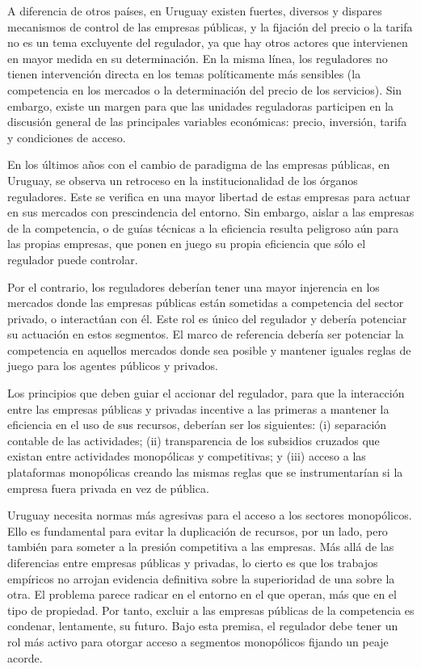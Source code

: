 \documentclass[
  12pt,
  spanish,
]{book}
\begin{document}
A diferencia de otros países, en Uruguay existen fuertes, diversos y dispares mecanismos de control de las empresas públicas, y la fijación del precio o la tarifa no es un tema excluyente del regulador, ya que hay otros actores que intervienen en mayor medida en su determinación. En la misma línea, los reguladores no tienen intervención directa en los temas políticamente más sensibles (la competencia en los mercados o la determinación del precio de los servicios). Sin embargo, existe un margen para que las unidades reguladoras participen en la discusión general de las principales variables económicas: precio, inversión, tarifa y condiciones de acceso.

En los últimos años con el cambio de paradigma de las empresas públicas, en Uruguay, se observa un retroceso en la institucionalidad de los órganos reguladores. Este se verifica en una mayor libertad de estas empresas para actuar en sus mercados con prescindencia del entorno. Sin embargo, aislar a las empresas de la competencia, o de guías técnicas a la eficiencia resulta peligroso aún para las propias empresas, que ponen en juego su propia eficiencia que sólo el regulador puede controlar.

Por el contrario, los reguladores deberían tener una mayor injerencia en los mercados donde las empresas públicas están sometidas a competencia del sector privado, o interactúan con él. Este rol es único del regulador y debería potenciar su actuación en estos segmentos. El marco de referencia debería ser potenciar la competencia en aquellos mercados donde sea posible y mantener iguales reglas de juego para los agentes públicos y privados.

Los principios que deben guiar el accionar del regulador, para que la interacción entre las empresas públicas y privadas incentive a las primeras a mantener la eficiencia en el uso de sus recursos, deberían ser los siguientes: (i) separación contable de las actividades; (ii) transparencia de los subsidios cruzados que existan entre actividades monopólicas y competitivas; y (iii) acceso a las plataformas monopólicas creando las mismas reglas que se instrumentarían si la empresa fuera privada en vez de pública.

Uruguay necesita normas más agresivas para el acceso a los sectores monopólicos. Ello es fundamental para evitar la duplicación de recursos, por un lado, pero también para someter a la presión competitiva a las empresas. Más allá de las diferencias entre empresas públicas y privadas, lo cierto es que los trabajos empíricos no arrojan evidencia definitiva sobre la superioridad de una sobre la otra. El problema parece radicar en el entorno en el que operan, más que en el tipo de propiedad. Por tanto, excluir a las empresas públicas de la competencia es condenar, lentamente, su futuro. Bajo esta premisa, el regulador debe tener un rol más activo para otorgar acceso a segmentos monopólicos fijando un peaje acorde.
\end{document}
